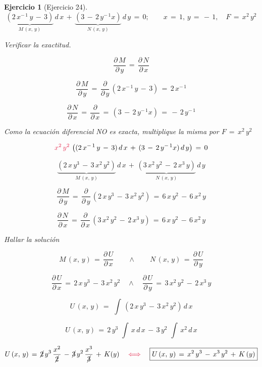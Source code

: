 \documentclass[a4paper,11pt]{book}
\newtheorem{ejer}{Ejercicio}[section]
\begin{document}
\begin{ejer}[Ejercicio 24] 

  $$\underbrace{(2\,x^{-\,1}\,y\,-\,3)}_{M\,(x,\,y)}\,d\,x\,+\,\underbrace{(3\,-\,2\,y^{-\,1}x)}_{N\,(x,\,y)}\,d\,y\,=\,0; \qquad x\,=\,1, \, y\,=\,-\,1, \quad F\,=\,x^{2}\,y^{2}$$ 

 Verificar la exactitud. 

$$\dfrac{\partial\,M}{\partial\,y}\,=\,\dfrac{\partial\,N}{\partial\,x}$$ 

$$\dfrac{\partial\,M}{\partial\,y}\,=\,\dfrac{\partial}{\partial\,y}\,(2\,x^{-\,1}\,y\,-\,3)\,=\,2\,x^{-\,1}$$ 

$$\dfrac{\partial\,N}{\partial\,x}\,=\,\dfrac{\partial}{\partial\,x}\,=\,(3\,-\,2\,y^{-\,1}x)\,=\,-\,2\,y^{-\,1}$$

 Como la ecuación diferencial NO es exacta, multiplique la misma por $F\,=\,x^{2}\,y^{2}$ 


$$\textcolor{amaranth}{x^{2}\,y^{2}}\,\left( (2\,x^{-\,1}\,y\,-\,3)\,d\,x\,+\,(3\,-\,2\,y^{-\,1}x)\,d\,y \right) \,=\,0$$ 

$$\underbrace{(2\,x\,y^{3}\,-\,3\,x^{2}\,y^{2})}_{M\,(x,\,y)}\,d\,x\,+\,\underbrace{(3\,x^{2}\,y^{2}\,-\,2\,x^{3}\,y)}_{N\,(x,\,y)}\,d\,y$$ 

$$\dfrac{\partial\,M}{\partial\,y}\,=\,\dfrac{\partial}{\partial\,y}\,(2\,x\,y^{3}\,-\,3\,x^{2}\,y^{2})\,=\,\boxed{6\,x\,y^{2}\,-\,6\,x^{2}\,y}$$ 

$$\dfrac{\partial\,N}{\partial\,x}\,=\,\dfrac{\partial}{\partial\,x}\,(3\,x^{2}\,y^{2}\,-\,2\,x^{3}\,y)\,=\,\boxed{6\,x\,y^{2}\,-\,6\,x^{2}\,y}$$ 

 Hallar la solución 

$$\boxed{M\,(x,\,y)\,=\,\dfrac{\partial\,U}{\partial\,x}} \qquad \wedge \qquad \boxed{N\,(x,\,y)\,=\,\dfrac{\partial\,U}{\partial\,y}}$$

$$\boxed{\dfrac{\partial\,U}{\partial\,x}\,=\,2\,x\,y^{3}\,-\,3\,x^{2}\,y^{2}} \quad \wedge \quad \boxed{\dfrac{\partial\,U}{\partial\,y}\,=\,3\,x^{2}\,y^{2}\,-\,2\,x^{3}\,y} $$ 

$$U\,(x,\,y)\,=\,\displaystyle\,\int\,\left(2\,x\,y^{3}\,-\,3\,x^{2}\,y^{2} \right)\,d\,x$$ 

$$U\,(x,\,y)\,=\,2\,y^{3}\,\displaystyle\,\int\,x\,d\,x\,-\,3\,y^{2}\,\displaystyle\,\int\,x^{2}\,d\,x$$ 

$$U\,(x,\,y)\,=\,\cancel{2}\,y^{3}\,\dfrac{x^{2}}{\cancel{2}}\,-\,\cancel{3}\,y^{2}\,\dfrac{x^{3}}{\cancel{3}}\,+\,K(y) \quad \textcolor{amaranth}{\iff} \quad \boxed{U\,(x,\,y)\,=\,x^{2}\,y^{3}\,-\,x^{3}\,y^{2}\,+\,K\,(y)}$$ 


\end{ejer}
\end{document}
